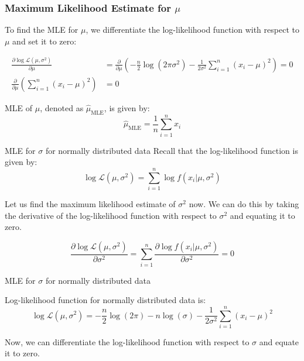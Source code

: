 \documentclass{beamer}
\begin{document}
\begin{frame}
    \frametitle{Maximum Likelihood Estimate for $\mu$}
    
    To find the MLE for $\mu$, we differentiate the log-likelihood function with respect to $\mu$ and set it to zero:
    
    \begin{align*}
        \frac{\partial \log \mathcal{L}(\mu, \sigma^2)}{\partial \mu} &= \frac{\partial}{\partial \mu} \left(-\frac{n}{2} \log (2\pi\sigma^2) - \frac{1}{2\sigma^2} \sum_{i=1}^n (x_i-\mu)^2\right) =0\\
        \frac{\partial}{\partial \mu} \left(\sum_{i=1}^n (x_i-\mu)^2\right) &= 0
    \end{align*}
    
    \begin{tcolorbox}[colback=metropolisblue!5,colframe=metropolisblue,title=Maximum Likelihood Estimate for $\mu$]
        MLE of $\mu$, denoted as $\hat{\mu}_{\text{MLE}}$, is given by:
        \begin{equation*}
            \hat{\mu}_{\text{MLE}} = \frac{1}{n}\sum_{i=1}^n x_i
        \end{equation*}
    \end{tcolorbox}
    
    \end{frame}

\begin{frame}{MLE for $\sigma$ for normally distributed data}
    Recall that the log-likelihood function is given by:
    \begin{equation}
        \log \mathcal{L}(\mu, \sigma^2) = \sum_{i=1}^n \log f(x_i|\mu, \sigma^2)
    \end{equation}

    Let us find the maximum likelihood estimate of $\sigma^2$ now. We can do this by taking the derivative of the log-likelihood function with respect to $\sigma^2$ and equating it to zero.   

    \begin{equation}
        \frac{\partial \log \mathcal{L}(\mu, \sigma^2)}{\partial \sigma^2} = \sum_{i=1}^n \frac{\partial \log f(x_i|\mu, \sigma^2)}{\partial \sigma^2} = 0
    \end{equation}
    
\end{frame}

\begin{frame}{MLE for $\sigma$ for normally distributed data}
    \begin{tcolorbox}[colback=metropolisblue!5,colframe=metropolisblue,title=Log Likelihood Function for Univariate Normal Distribution]
        Log-likelihood function for normally distributed data is:
        \[
            \log \mathcal{L}(\mu, \sigma^2) = -\frac{n}{2} \log(2\pi) - n\log(\sigma) - \frac{1}{2\sigma^2} \sum_{i=1}^n (x_i-\mu)^2
            \]
    \end{tcolorbox}

Now, we can differentiate the log-likelihood function with respect to $\sigma$ and equate it to zero.
\end{frame}
\end{document}

